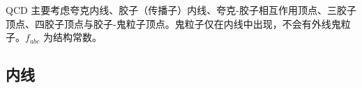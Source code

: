 

\begin{issues}
\issueMissDepend
\issueAbstract
\end{issues}

QCD 主要考虑夸克内线、胶子（传播子）内线、夸克-胶子相互作用顶点、三胶子顶点、四胶子顶点与胶子-鬼粒子顶点。鬼粒子仅在内线中出现，不会有外线鬼粒子。$f_{abc}$ 为结构常数。

\subsection{内线}
